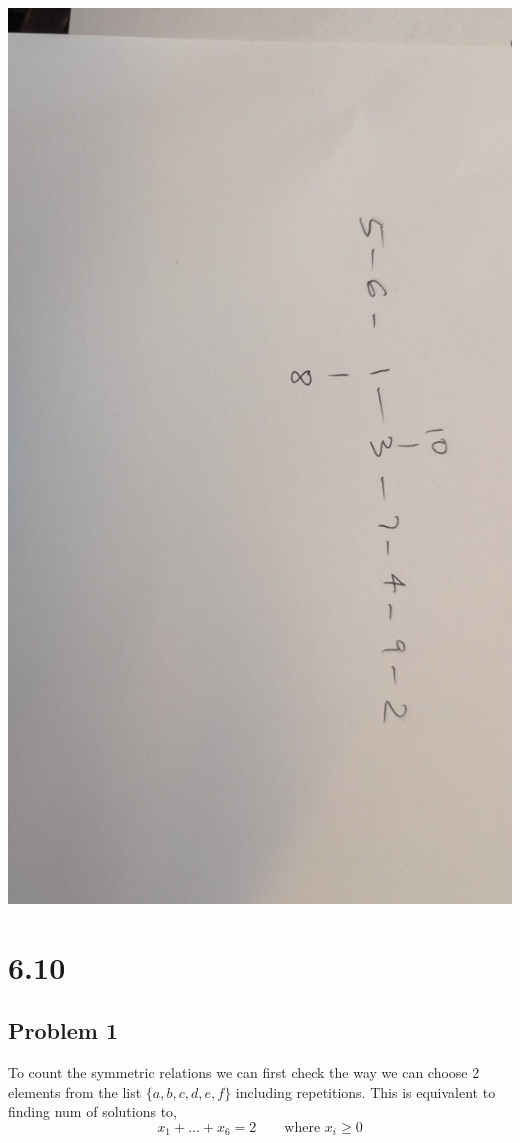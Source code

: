 \documentclass[a4paper]{report}
\begin{document}
\includegraphics[angle=90,scale=.20]{40}


\section*{6.10}


\subsection*{Problem 1}
To count the symmetric relations we can first check the way we can choose 2 elements from the list $\{a,b,c,d,e,f\}$ including repetitions. This is equivalent to finding num of solutions to, 
$$ x_1 + \dots + x_6 = 2  \qquad \text{where $x_i \ge 0$} $$ 
\end{document}
